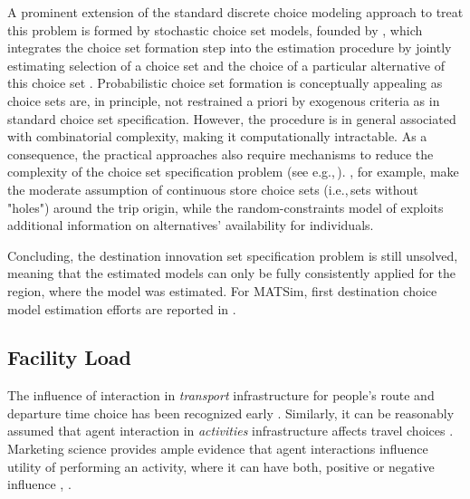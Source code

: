 A prominent extension of the standard discrete choice modeling approach to treat this problem is formed by stochastic choice set models, founded by \citet[][]{Manski_TD_1977, BurnettKPHanson_TRR_1979, BurnettKP_UG_1980}, which integrates the choice set formation step into the estimation procedure by jointly estimating selection of a choice set and the choice of a particular alternative of this choice set \citep[][]{KaplanEtAl_TRB_2009, PagliaraTimmermans_TransLett_2009, Manski_TD_1977, Swait_TransResPartB_2001, HorowitzLouviere_IJRM_1995, BenAkivaBoccara_IJRM_1995, SwaitBenAkiva_TransResPartB_1987, Swait_TransResPartB_2001, MartinezEtAl_TransResPartB_2009, CascettaPapola_TransResPartA_2009, BierlaireEtAl_2_STRC_2009, ScroginEtAl_TechRep_UCF_2004, ManraiAndrews_EJOR_1998, Ansah_TransRes_1977}. Probabilistic choice set formation is conceptually appealing as choice sets are, in principle, not restrained a priori by exogenous criteria as in standard choice set specification. However, the procedure is in general associated with combinatorial complexity, making it computationally intractable. As a consequence, the practical approaches also require mechanisms to reduce the complexity of the choice set specification problem (see e.g.,\,\citet[][p.11]{BenAkivaBoccara_IJRM_1995}). \citet[][]{ZhengJieGuo_TRB_2008}, for example, make the moderate assumption of continuous store choice sets (i.e.,\,sets without "holes") around the trip origin, while the random-constraints model of \citet[][]{BenAkivaBoccara_IJRM_1995} exploits additional information on alternatives' availability for individuals.

Concluding, the destination innovation set specification problem is still unsolved, meaning that the estimated models can only be fully consistently applied for the region, where the model was estimated. For MATSim, first destination choice model estimation efforts are reported in \citet[][Chapter 5]{Horni_PhDThesis_2013}.

\subsection{Facility Load}
\label{sec:facilityload}
The influence of interaction in \emph{transport} infrastructure for people's route and departure time choice has been recognized early \citep[e.g.,][]{Pigou_1920, Knight_QJE_1924, Wardrop_PICE_1952}. Similarly, it can be reasonably assumed that agent interaction in \emph{activities} infrastructure affects travel choices \citep[][]{Axhausen_SSRL_2006}. Marketing science provides ample evidence that agent interactions influence utility of performing an activity, where it can have both, positive or negative influence \citep[][p.331]{BakerJEtAl_JAMS_1994}, \citep[][]{ErogluAndHarrell_JR_1986, ErogluAndMachleit_JR_1990, ErogluEtAl_JBR_2005, HarrellEtAl_JMR_1980, HuiAndBateson_JCR_1991, PonsEtAl_PsychMark_2006}.

